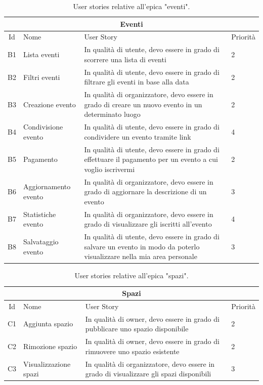 \documentclass[9pt]{extarticle}
\begin{document}
\begin{table}[!htb]
	\centering
	\begin{tabular}{clp{7cm}l} %
		\toprule
		\multicolumn{4}{c}{\textbf{Eventi}}\\ \midrule
		Id & Nome & User Story & Priorità \\ \midrule
		B1  & Lista eventi            & In qualità di utente, devo essere in grado di scorrere una lista di eventi                                               &  2\\
		B2  & Filtri eventi           & In qualità di utente, devo essere in grado di filtrare gli eventi in base alla data                                      &  2 \\
		B3  & Creazione evento        & In qualità di organizzatore, devo essere in grado di creare un nuovo evento in un determinato luogo                      &  2 \\
		B4  & Condivisione evento     & In qualità di utente, devo essere in grado di condividere un evento tramite link                                         &  4\\
		B5  & Pagamento               & In qualità di utente, devo essere in grado di effettuare il pagamento per un evento a cui voglio iscrivermi              & 2\\
		B6  & Aggiornamento evento    & In qualità di organizzatore, devo essere in grado di aggiornare la descrizione di un evento                              & 3\\
		B7  & Statistiche evento      & In qualità di organizzatore, devo essere in grado di visualizzare gli iscritti all'evento                                & 4\\
		B8  & Salvataggio evento      & In qualità di utente, devo essere in grado di salvare un evento in modo da poterlo visualizzare nella mia area personale & 3\\
		\bottomrule
	\end{tabular}
	\caption{User stories relative all'epica "eventi".}
	\label{tab:eventi}
\end{table}

\begin{table}[!htb]
	\centering
	\begin{tabular}{clp{7cm}l} %
		\toprule
		\multicolumn{4}{c}{\textbf{Spazi}}\\ \midrule
		Id & Nome & User Story & Priorità \\ \midrule
		C1  & Aggiunta spazio  & In qualità di owner, devo essere in grado di pubblicare uno spazio disponibile & 2\\
		C2 & Rimozione spazio & In qualità di owner, devo essere in grado di rimuovere uno spazio esistente & 2\\
		C3 & Visualizzazione spazi & In qualità di organizzatore, devo essere in grado di visualizzare gli spazi disponibili & 3\\
		\bottomrule
	\end{tabular}
	\caption{User stories relative all'epica "spazi".}
	\label{tab:spazi}
\end{table}
\end{document}
